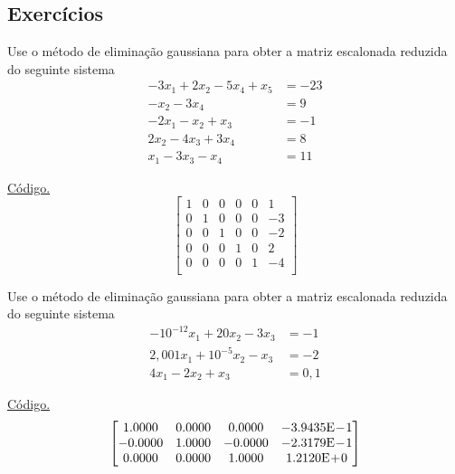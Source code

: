 \subsection*{Exercícios}

\begin{exer}\label{exer:egauss_reduzida}
  Use o método de eliminação gaussiana para obter a matriz escalonada reduzida do seguinte sistema
  \begin{align}
    -3x_1 + 2x_2 -5x_4 + x_5 &= -23\\
    -x_2 -3x_4 &= 9\\
    -2x_1 -x_2 + x_3 &= -1\\
    2x_2 - 4x_3 + 3x_4 &= 8\\
    x_1 - 3x_3 - x_4 &= 11
  \end{align}
\end{exer}
\begin{resp}
    \ifisoctave 
  \href{https://github.com/phkonzen/notas/blob/master/src/MatematicaNumerica/cap_sl_direto/dados/exer_egauss_reduzida/exer_egauss_reduzida.m}{Código.} 
  \fi
  $$
  \begin{bmatrix}
    1 & 0 & 0 & 0 & 0 & 1\\
    0 & 1 & 0 & 0 & 0 & -3\\
    0 & 0 & 1 & 0 & 0 & -2\\
    0 & 0 & 0 & 1 & 0 & 2\\
    0 & 0 & 0 & 0 & 1 & -4\\
  \end{bmatrix}
  $$
\end{resp}

\begin{exer}\label{exer:egauss_arredondamento}
  Use o método de eliminação gaussiana para obter a matriz escalonada reduzida do seguinte sistema
  \begin{align}
    -10^{-12}x_1 + 20x_2 - 3x_3 &= -1\\
    2,001x_1 + 10^{-5}x_2 - x_3 &= -2\\
    4x_1 - 2x_2 + x_3 &= 0,1
  \end{align}
\end{exer}
\begin{resp}
  \ifisoctave 
  \href{https://github.com/phkonzen/notas/blob/master/src/MatematicaNumerica/cap_sl_direto/dados/exer_egauss_arredondamento/exer_egauss_arredondamento.m}{Código.} 
  \fi
  $$
  \begin{bmatrix}
   1.0000 &  0.0000 &  0.0000 & -3.9435\mathrm{E}\!-\!1\\
  -0.0000 &  1.0000 & -0.0000 & -2.3179\mathrm{E}\!-\!1\\
   0.0000 &  0.0000 &  1.0000 &  1.2120\mathrm{E}\!+\!0
  \end{bmatrix}
  $$
\end{resp}

